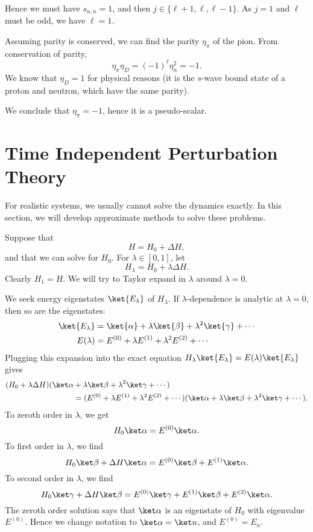 \documentclass[12pt]{article}
\begin{document}
Hence we must have $s_{n,n} = 1$, and then $j \in \{\ell+1,\ell,\ell-1\}$. As $j = 1$ and $\ell$ must be odd, we have $\ell = 1$.

Assuming parity is conserved, we can find the parity $\eta_\pi$ of the pion. From conservation of parity,
\[
	\eta_\pi \eta_D = (-1)^{\ell}\eta_n^2 = -1.
\]
We know that $\eta_D = 1$ for physical reasons (it is the $s$-wave bound state of a proton and neutron, which have the same parity).

We conclude that $\eta_\pi = -1$, hence it is a pseudo-scalar.

\newpage

\section{Time Independent Perturbation Theory}
\label{sec:ti_pert_thy}

For realistic systems, we usually cannot solve the dynamics exactly. In this section, we will develop approximate methods to solve these problems.

Suppose that
\[
H = H_0 + \Delta H,
\]
and that we can solve for $H_0$. For $\lambda \in [0, 1]$, let
\[
H_\lambda = H_0 + \lambda \Delta H.
\]
Clearly $H_{1} = H$. We will try to Taylor expand in $\lambda$ around $\lambda = 0$.

We seek energy eigenstates $\ket{E_\lambda}$ of $H_\lambda$. If $\lambda$-dependence is analytic at $\lambda = 0$, then so are the eigenstates:
\begin{align*}
	\ket{E_\lambda} &= \ket{\alpha} + \lambda \ket{\beta} + \lambda^2 \ket{\gamma} + \cdots \\
	E(\lambda) &= E^{(0)} + \lambda E^{(1)} + \lambda^2 E^{(2)} + \cdots
\end{align*}
Plugging this expansion into the exact equation $H_\lambda \ket{E_\lambda} = E(\lambda) \ket{E_\lambda}$ gives
\begin{align*}
	(H_0 + \lambda \Delta H)(\ket \alpha &+ \lambda \ket \beta + \lambda^2 \ket \gamma + \cdots) \\
									      &= (E^{(0)} + \lambda E^{(1)} + \lambda^2 E^{(2)} + \cdots)(\ket \alpha + \lambda \ket \beta + \lambda^2 \ket \gamma + \cdots).
\end{align*}
To zeroth order in $\lambda$, we get
\[
H_0 \ket \alpha = E^{(0)} \ket \alpha.
\]
To first order in $\lambda$, we find
\[
H_0 \ket \beta + \Delta H \ket \alpha = E^{(0)} \ket \beta + E^{(1)} \ket \alpha.
\]
To second order in $\lambda$, we find
\[
H_0 \ket \gamma + \Delta H \ket \beta = E^{(0)} \ket \gamma + E^{(1)} \ket \beta + E^{(2)} \ket \alpha.
\]
The zeroth order solution says that $\ket \alpha$ is an eigenstate of $H_0$ with eigenvalue $E^{(0)}$. Hence we change notation to $\ket\alpha = \ket n$, and $E^{(0)} = E_n$.
\end{document}
